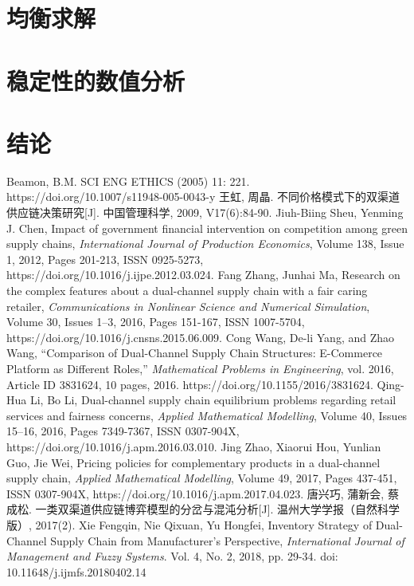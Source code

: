 \documentclass{article}
\begin{document}
\section{均衡求解}
\par
\section{稳定性的数值分析}
\par
\section{结论}
\par

\begin{thebibliography}{1}
 Beamon, B.M. SCI ENG ETHICS (2005) 11: 221. https://doi.org/10.1007/s11948-005-0043-y
 王虹, 周晶. 不同价格模式下的双渠道供应链决策研究[J]. 中国管理科学, 2009, V17(6):84-90.
 Jiuh-Biing Sheu, Yenming J. Chen, Impact of government financial intervention on competition among green supply chains, \emph{International Journal of Production Economics}, Volume 138, Issue 1, 2012, Pages 201-213, ISSN 0925-5273, https://doi.org/10.1016/j.ijpe.2012.03.024.
 Fang Zhang, Junhai Ma, Research on the complex features about a dual-channel supply chain with a fair caring retailer, \emph{Communications in Nonlinear Science and Numerical Simulation}, Volume 30, Issues 1–3, 2016, Pages 151-167, ISSN 1007-5704, https://doi.org/10.1016/j.cnsns.2015.06.009.
 Cong Wang, De-li Yang, and Zhao Wang, “Comparison of Dual-Channel Supply Chain Structures: E-Commerce Platform as Different Roles,” \emph{Mathematical Problems in Engineering}, vol. 2016, Article ID 3831624, 10 pages, 2016. https://doi.org/10.1155/2016/3831624.
 Qing-Hua Li, Bo Li, Dual-channel supply chain equilibrium problems regarding retail services and fairness concerns, \emph{Applied Mathematical Modelling}, Volume 40, Issues 15–16, 2016, Pages 7349-7367, ISSN 0307-904X, https://doi.org/10.1016/j.apm.2016.03.010.
 Jing Zhao, Xiaorui Hou, Yunlian Guo, Jie Wei, Pricing policies for complementary products in a dual-channel supply chain, \emph{Applied Mathematical Modelling}, Volume 49, 2017, Pages 437-451, ISSN 0307-904X, https://doi.org/10.1016/j.apm.2017.04.023.
 唐兴巧, 蒲新会, 蔡成松. 一类双渠道供应链博弈模型的分岔与混沌分析[J]. 温州大学学报（自然科学版）, 2017(2).
 Xie Fengqin, Nie Qixuan, Yu Hongfei, Inventory Strategy of Dual-Channel Supply Chain from Manufacturer's Perspective, \emph{International Journal of Management and Fuzzy Systems}. Vol. 4, No. 2, 2018, pp. 29-34. doi: 10.11648/j.ijmfs.20180402.14

\end{thebibliography}
\end{document}
